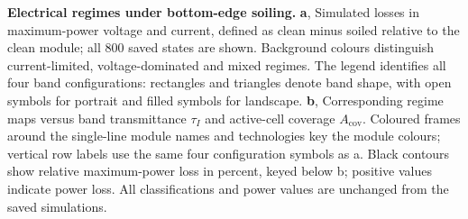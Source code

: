 \caption{\textbf{Electrical regimes under bottom-edge soiling.} \textbf{a}, Simulated losses in maximum-power voltage and current, defined as clean minus soiled relative to the clean module; all 800 saved states are shown. Background colours distinguish current-limited, voltage-dominated and mixed regimes. The legend identifies all four band configurations: rectangles and triangles denote band shape, with open symbols for portrait and filled symbols for landscape. \textbf{b}, Corresponding regime maps versus band transmittance $\tau_I$ and active-cell coverage $A_{\mathrm{cov}}$. Coloured frames around the single-line module names and technologies key the module colours; vertical row labels use the same four configuration symbols as a. Black contours show relative maximum-power loss in percent, keyed below b; positive values indicate power loss. All classifications and power values are unchanged from the saved simulations.\label{fig:regimes}}
